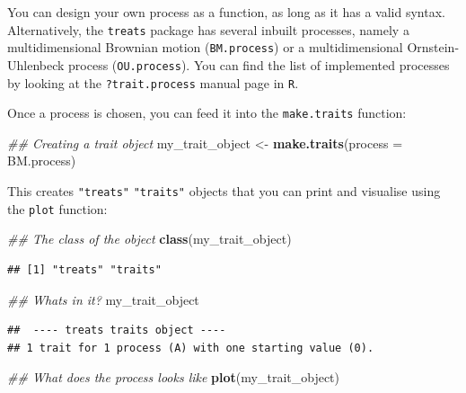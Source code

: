\documentclass[
]{book}
\newenvironment{Shaded}{\begin{snugshade}}{\end{snugshade}}
\newcommand{\CommentTok}[1]{\textcolor[rgb]{0.56,0.35,0.01}{\textit{#1}}}
\newcommand{\DataTypeTok}[1]{\textcolor[rgb]{0.13,0.29,0.53}{#1}}
\newcommand{\KeywordTok}[1]{\textcolor[rgb]{0.13,0.29,0.53}{\textbf{#1}}}
\newcommand{\NormalTok}[1]{#1}
\newcommand{\StringTok}[1]{\textcolor[rgb]{0.31,0.60,0.02}{#1}}
\begin{document}
You can design your own process as a function, as long as it has a valid syntax.
Alternatively, the \texttt{treats} package has several inbuilt processes, namely a multidimensional Brownian motion (\texttt{BM.process}) or a multidimensional Ornstein-Uhlenbeck process (\texttt{OU.process}).
You can find the list of implemented processes by looking at the \texttt{?trait.process} manual page in \texttt{R}.

Once a process is chosen, you can feed it into the \texttt{make.traits} function:

\begin{Shaded}
\begin{Highlighting}[]
\CommentTok{\#\# Creating a trait object}
\NormalTok{my\_trait\_object \textless{}{-}}\StringTok{ }\KeywordTok{make.traits}\NormalTok{(}\DataTypeTok{process =}\NormalTok{ BM.process)}
\end{Highlighting}
\end{Shaded}

This creates \texttt{"treats"} \texttt{"traits"} objects that you can print and visualise using the \texttt{plot} function:

\begin{Shaded}
\begin{Highlighting}[]
\CommentTok{\#\# The class of the object}
\KeywordTok{class}\NormalTok{(my\_trait\_object)}
\end{Highlighting}
\end{Shaded}

\begin{verbatim}
## [1] "treats" "traits"
\end{verbatim}

\begin{Shaded}
\begin{Highlighting}[]
\CommentTok{\#\# What\textquotesingle{}s in it?}
\NormalTok{my\_trait\_object}
\end{Highlighting}
\end{Shaded}

\begin{verbatim}
##  ---- treats traits object ---- 
## 1 trait for 1 process (A) with one starting value (0).
\end{verbatim}

\begin{Shaded}
\begin{Highlighting}[]
\CommentTok{\#\# What does the process looks like}
\KeywordTok{plot}\NormalTok{(my\_trait\_object)}
\end{Highlighting}
\end{Shaded}
\end{document}
